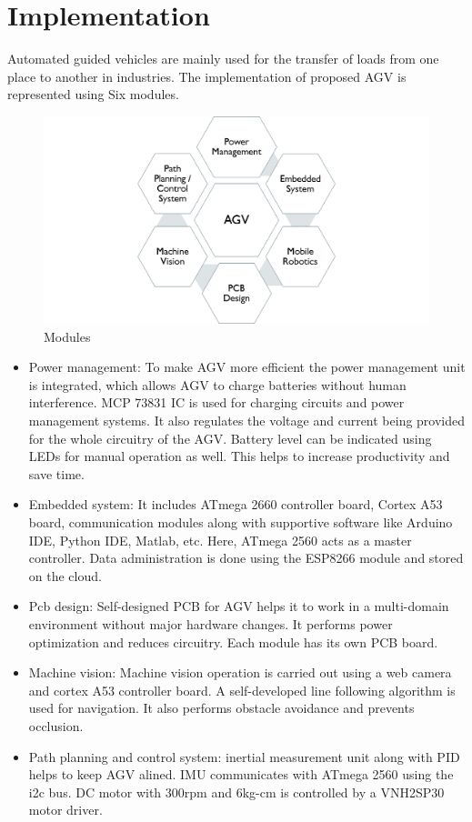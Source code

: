 \documentclass[12pt]{article}
\begin{document}
\section{Implementation}

Automated guided vehicles are mainly used for the transfer of loads from one place to another in industries. The implementation of proposed AGV is represented using Six modules.

\begin{figure}[htp]
\centering
\includegraphics[width=15cm]{Modules.png}
\caption{Modules}
\label{fig}
\end{figure}

\begin{itemize}
  \item Power management: To make AGV more efficient the power management unit is integrated, which allows AGV to charge batteries without human interference. MCP 73831 IC is used for charging circuits and power management systems. It also regulates the voltage and current being provided for the whole circuitry of the AGV. Battery level can be indicated using LEDs for manual operation as well. This helps to increase productivity and save time.
  \item Embedded system: It includes ATmega 2660 controller board, Cortex A53 board, communication modules along with supportive software like Arduino IDE, Python IDE, Matlab, etc. Here, ATmega 2560 acts as a master controller. Data administration is done using the ESP8266 module and stored on the cloud.
  \item Pcb design: Self-designed PCB for AGV helps it to work in a multi-domain environment without major hardware changes. It performs power optimization and reduces circuitry. Each module has its own PCB board.
  \item Machine vision:  Machine vision operation is carried out using a web camera and cortex A53 controller board. A self-developed line following algorithm is used for navigation. It also performs obstacle avoidance and prevents occlusion.
  \item Path planning and control system: inertial measurement unit along with PID helps to keep AGV alined. IMU communicates with ATmega 2560 using the i2c bus. DC motor with 300rpm and 6kg-cm is controlled by a VNH2SP30 motor driver.

\end{itemize}
\newpage
\end{document}
